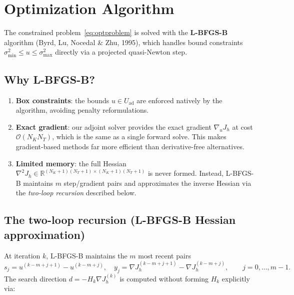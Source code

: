 \documentclass[11pt, a4paper]{article}
\newcommand{\R}{\mathbb{R}}
\theoremstyle{definition}
\theoremstyle{plain}
\begin{document}
\section{Optimization Algorithm}
\label{sec:algorithm}

The constrained problem~\eqref{eq:optproblem} is solved with the
\textbf{L-BFGS-B} algorithm (Byrd, Lu, Nocedal \& Zhu, 1995), which handles
bound constraints $\sigma_{\min}^2 \leq u \leq \sigma_{\max}^2$ directly
via a projected quasi-Newton step.

\subsection{Why L-BFGS-B?}

\begin{enumerate}[label=(\roman*)]
  \item \textbf{Box constraints}: the bounds $u \in U_\text{ad}$ are enforced
        natively by the algorithm, avoiding penalty reformulations.
  \item \textbf{Exact gradient}: our adjoint solver provides the exact gradient
        $\nabla_u J_h$ at cost $\mathcal{O}(N_K N_T)$, which is the same as
        a single forward solve.  This makes gradient-based methods far more
        efficient than derivative-free alternatives.
  \item \textbf{Limited memory}: the full Hessian $\nabla^2 J_h \in
        \R^{(N_K+1)(N_T+1) \times (N_K+1)(N_T+1)}$ is never formed.  Instead,
        L-BFGS-B maintains $m$ step/gradient pairs and approximates the inverse
        Hessian via the \emph{two-loop recursion} described below.
\end{enumerate}

\subsection{The two-loop recursion (L-BFGS-B Hessian approximation)}

At iteration $k$, L-BFGS-B maintains the $m$ most recent pairs
\[
  s_j = u^{(k-m+j+1)} - u^{(k-m+j)}, \quad
  y_j = \nabla J_h^{(k-m+j+1)} - \nabla J_h^{(k-m+j)},
  \qquad j = 0, \ldots, m-1.
\]
The search direction $d = -H_k \nabla J_h^{(k)}$ is computed without
forming $H_k$ explicitly via:
\end{document}
